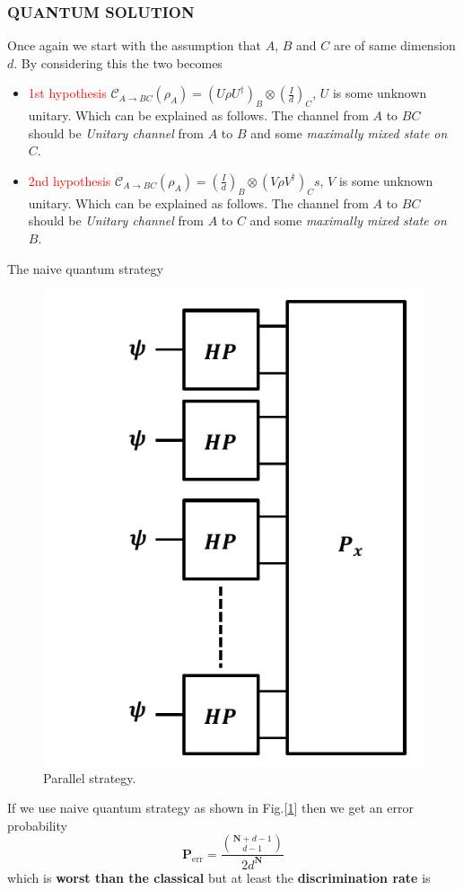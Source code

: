 \documentclass[a4paper,11pt]{article}
\begin{document}
\subsubsection{QUANTUM SOLUTION}
Once again we start with the assumption that $A$, $B$ and $C$ are of same dimension $d$. By considering this the two becomes
\begin{itemize}
	\item \textcolor{red}{1st hypothesis} $\mathcal{C}_{A\rightarrow BC}(\rho_A) = (U\rho U^\dagger)_B\otimes\left(\frac{I}{d}\right)_C$, $U$ is some unknown unitary. Which can be explained as follows. The channel from $A$ to $BC$ should be \textit{Unitary channel} from $A$ to $B$ and some \textit{maximally mixed state on} $C$.
	\item \textcolor{red}{2nd hypothesis} $\mathcal{C}_{A\rightarrow BC}(\rho_A) = \left(\frac{I}{d}\right)_B \otimes (V\rho V^\dagger)_Cs $, $V$ is some unknown unitary. Which can be explained as follows. The channel from $A$ to $BC$ should be \textit{Unitary channel} from $A$ to $C$ and some \textit{maximally mixed state on} $B$.
\end{itemize}
The naive quantum strategy
\begin{figure}[tbh!]
	\centering
	\includegraphics[width=0.5\linewidth]{pics/parallel-strategy}
	\caption{Parallel strategy.}
	\label{circ:naive-quantum-strategy}
\end{figure}
If we use naive quantum strategy as shown in Fig.[\ref{circ:naive-quantum-strategy}] then we get an error probability
\begin{equation}
	\mathbf{P}_\text{err}=\frac{\binom{\mathbf{N}+d-1}{d-1}}{2d^\mathbf{N}}
\end{equation}
which is \textbf{worst than the classical} but at least the \textbf{discrimination rate} is
\end{document}
